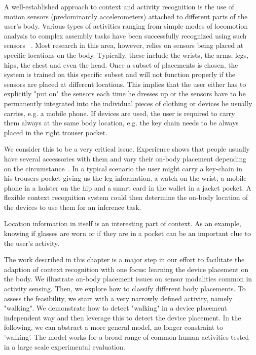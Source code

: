 A well-established approach to context and activity
recognition is the use of motion sensors (predominantly
accelerometers) attached to different parts of the user's body.
Various types of activities ranging from simple modes of locomotion
analysis to complex assembly tasks have been successfully recognized
using such sensors~\cite{seon2001recognition,bao2004activity,lukowicz2004recognizing} .  
Most research in this area, however, relies on sensors being placed at specific
locations on the body. Typically, these include the wrists, the arms,
legs, hips, the chest and even the head. Once a subset of placements
is chosen, the system is trained on this specific subset and
will not function properly if the sensors are placed at different
locations.  This implies that the user either has to explicitly "put
on" the sensors each time he dresses up or the sensors have to be
permanently integrated into the individual pieces of clothing or
devices he usually carries, e.g. a mobile phone. If devices are used,
the user is required to carry them always at the same body location, e.g. the key chain needs to be
always placed in the right trouser pocket. 

We consider this to be a very critical issue. Experience shows that
people usually have several accessories with them and vary their
on-body placement depending on the circumstance~\cite{Ichikawa:2005p6295}. In a
typical scenario the user might carry a key-chain in his trousers
pocket giving us the leg information, a watch on the wrist, a mobile
phone in a holster on the hip and a smart card in the wallet in a jacket
pocket. A flexible context recognition system could then 
determine the on-body location of the devices to use them for an inference task.

Location information in itself is an interesting part of
context. As an example, knowing if glasses are worn or if they are in
a pocket can be an important clue to the user's activity.

The work described in this chapter is a major step in our effort to
facilitate the adaption of context recognition
with one focus: learning the device placement on the body. We
illustrate on-body placement issues on sensor modalities common in
activity sensing. Then, we explore how to classify different body
placements. To assess the feasibility, we start with a very
narrowly defined activity, namely "walking". We demonstrate how to
detect "walking" in a device placement independent way and then
leverage this to detect the device placement. In the following, we can abstract a
more general model, no longer constraint to 'walking'. The model works for a broad range of common human
activities tested in a large scale experimental evaluation.

